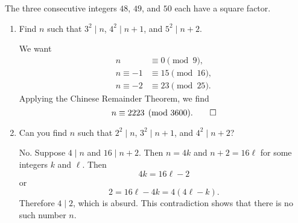  The three consecutive integers $48$, $49$, and $50$ each
have a square factor.
\begin{enumerate}
\item Find $n$ such that $3^2\mid n$, $4^2\mid n+1$, and
  $5^2\mid n+2$.
  \begin{solution}
    We want
    \begin{align*}
      n&\equiv0\pmod9, \\
      n\equiv-1&\equiv15\pmod{16}, \\
      n\equiv-2&\equiv23\pmod{25}.
    \end{align*}
    Applying the Chinese Remainder Theorem, we find
    \begin{equation*}
      n\equiv2223\pmod{3600}. \qedhere
    \end{equation*}
  \end{solution}
\item Can you find $n$ such that $2^2\mid n$, $3^2\mid n+1$, and
  $4^2\mid n+2$?
  \begin{solution}
    No. Suppose $4\mid n$ and $16\mid n+2$. Then $n = 4k$ and
    $n+2 = 16\ell$ for some integers $k$ and $\ell$. Then
    \begin{equation*}
      4k = 16\ell - 2
    \end{equation*}
    or
    \begin{equation*}
      2 = 16\ell - 4k = 4(4\ell - k).
    \end{equation*}
    Therefore $4\mid 2$, which is absurd. This contradiction shows
    that there is no such number $n$.
  \end{solution}
\end{enumerate}
